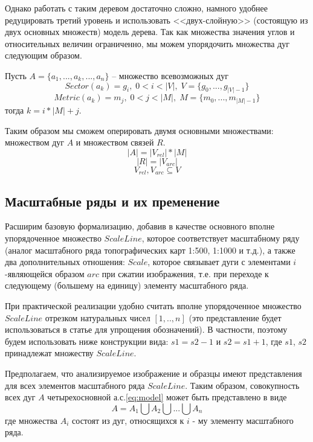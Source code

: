 Однако работать с таким деревом достаточно сложно, намного удобнее редуцировать третий уровень и использовать <<двух-слойную>> (состоящую из двух основных множеств) модель дерева. Так как множества значения углов и относительных величин ограниченно, мы можем упорядочить множества дуг следующим образом.

Пусть $A = \{a_1, ..., a_k, ..., a_n\}$ -- множество всевозможных дуг
$$Sector(a_k) = g_i,\; 0 < i < |V|,\;V = \{g_0, ..., g_{|V|-1}\}$$
$$Metric(a_k) = m_j,\; 0 < j < |M|,\;M = \{m_0, ..., m_{|M|-1}\}$$
тогда $k = i*|M| + j$.

Таким образом мы сможем оперировать двумя основными множествами: множеством дуг $A$ и множеством связей $R$.
$$|A| = |V_{rel}|*|M|$$
$$|R| = |V_{arc}|$$
$$V_{rel}, V_{arc} \subseteq V$$


\subsection{Масштабные ряды и их пременение}
Расширим базовую формализацию, добавив в качестве основного вполне упорядоченное множество $ScaleLine$, которое соответствует масштабному ряду (аналог масштабного ряда топографических карт 1:500,  1:1000 и т.д.), а также два дополнительных отношения: $Scale$,  которое связывает дуги с элементами $i$-являющейся образом $arc$ при сжатии изображения, т.е. при переходе к следующему (большему на единицу) элементу масштабного ряда.

При практической реализации удобно считать  вполне упорядоченное множество $ScaleLine$ отрезком натуральных чисел $[1,.., n]$ (это представление будет использоваться в статье для упрощения обозначений). В частности, поэтому будем использовать ниже конструкции вида: $s1  = s2 - 1$ и $s2  = s1 + 1$, где $s1$, $s2$  принадлежат  множеству $ScaleLine$.

Предполагаем,  что анализируемое изображение и образцы имеют представления для всех элементов масштабного ряда $ScaleLine$. Таким образом, совокупность всех дуг $A$ четырехосновной а.с.\ref{eq:model} может быть представлено в виде
\begin{equation}
A = A_1 \bigcup A_2 \bigcup ... \bigcup A_n
\label{eq:components_set}
\end{equation}
где  множества $A_i$ состоят из дуг, относящихся к $i$ - му элементу масштабного ряда. 

